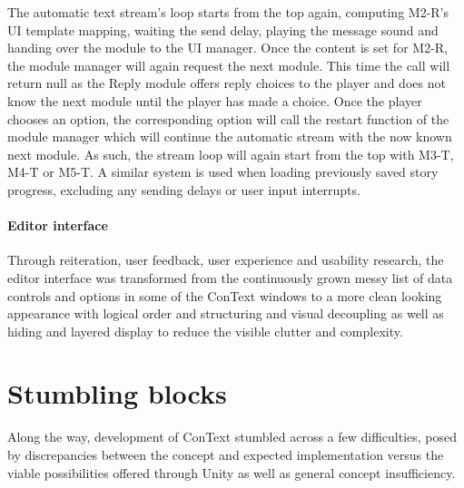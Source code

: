 The automatic text stream's loop starts from the top again, computing M2-R's UI template mapping, waiting the send delay, playing the message sound and handing over the module to the UI manager. Once the content is set for M2-R, the module manager will again request the next module. This time the call will return null as the Reply module offers reply choices to the player and does not know the next module until the player has made a choice. Once the player chooses an option, the corresponding option will call the restart function of the module manager which will continue the automatic stream with the now known next module. 
As such, the stream loop will again start from the top with M3-T, M4-T or M5-T. 
A similar system is used when loading previously saved story progress, excluding any sending delays or user input interrupts. 
\paragraph{Editor interface} Through reiteration, user feedback, user experience and usability research, the editor interface was transformed from the continuously grown messy list of data controls and options in some of the ConText windows to a more clean looking appearance with logical order and structuring and visual decoupling as well as hiding and layered display to reduce the visible clutter and complexity.

\section{Stumbling blocks}
Along the way, development of ConText stumbled across a few difficulties, posed by discrepancies between the concept and expected implementation versus the viable possibilities offered through Unity as well as general concept insufficiency. 
